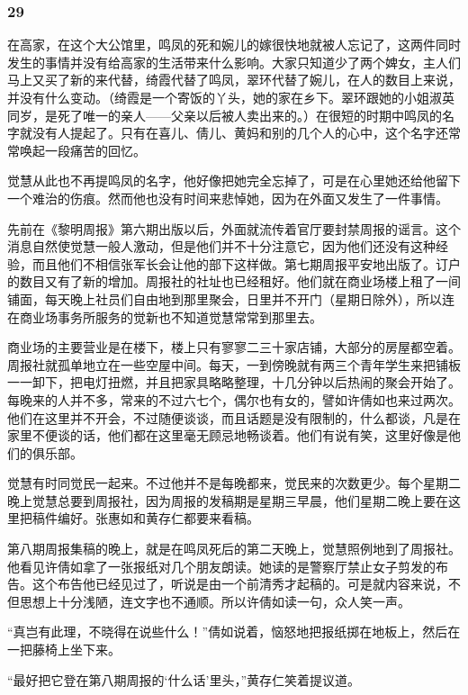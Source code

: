 \subsubsection*{29}

\par 在高家，在这个大公馆里，鸣凤的死和婉儿的嫁很快地就被人忘记了，这两件同时发生的事情并没有给高家的生活带来什么影响。大家只知道少了两个婢女，主人们马上又买了新的来代替，绮霞代替了鸣凤，翠环代替了婉儿，在人的数目上来说，并没有什么变动。（绮霞是一个寄饭的丫头，她的家在乡下。翠环跟她的小姐淑英同岁，是死了唯一的亲人——父亲以后被人卖出来的。）在很短的时期中鸣凤的名字就没有人提起了。只有在喜儿、倩儿、黄妈和别的几个人的心中，这个名字还常常唤起一段痛苦的回忆。
\par 觉慧从此也不再提鸣凤的名字，他好像把她完全忘掉了，可是在心里她还给他留下一个难治的伤痕。然而他也没有时间来悲悼她，因为在外面又发生了一件事情。
\par 先前在《黎明周报》第六期出版以后，外面就流传着官厅要封禁周报的谣言。这个消息自然使觉慧一般人激动，但是他们并不十分注意它，因为他们还没有这种经验，而且他们不相信张军长会让他的部下这样做。第七期周报平安地出版了。订户的数目又有了新的增加。周报社的社址也已经租好。他们就在商业场楼上租了一间铺面，每天晚上社员们自由地到那里聚会，日里并不开门（星期日除外），所以连在商业场事务所服务的觉新也不知道觉慧常常到那里去。
\par 商业场的主要营业是在楼下，楼上只有寥寥二三十家店铺，大部分的房屋都空着。周报社就孤单地立在一些空屋中间。每天，一到傍晚就有两三个青年学生来把铺板一一卸下，把电灯扭燃，并且把家具略略整理，十几分钟以后热闹的聚会开始了。每晚来的人并不多，常来的不过六七个，偶尔也有女的，譬如许倩如也来过两次。他们在这里并不开会，不过随便谈谈，而且话题是没有限制的，什么都谈，凡是在家里不便谈的话，他们都在这里毫无顾忌地畅谈着。他们有说有笑，这里好像是他们的俱乐部。
\par 觉慧有时同觉民一起来。不过他并不是每晚都来，觉民来的次数更少。每个星期二晚上觉慧总要到周报社，因为周报的发稿期是星期三早晨，他们星期二晚上要在这里把稿件编好。张惠如和黄存仁都要来看稿。
\par 第八期周报集稿的晚上，就是在鸣凤死后的第二天晚上，觉慧照例地到了周报社。他看见许倩如拿了一张报纸对几个朋友朗读。她读的是警察厅禁止女子剪发的布告。这个布告他已经见过了，听说是由一个前清秀才起稿的。可是就内容来说，不但思想上十分浅陋，连文字也不通顺。所以许倩如读一句，众人笑一声。
\par “真岂有此理，不晓得在说些什么！”倩如说着，恼怒地把报纸掷在地板上，然后在一把藤椅上坐下来。
\par “最好把它登在第八期周报的‘什么话’里头，”黄存仁笑着提议道。
